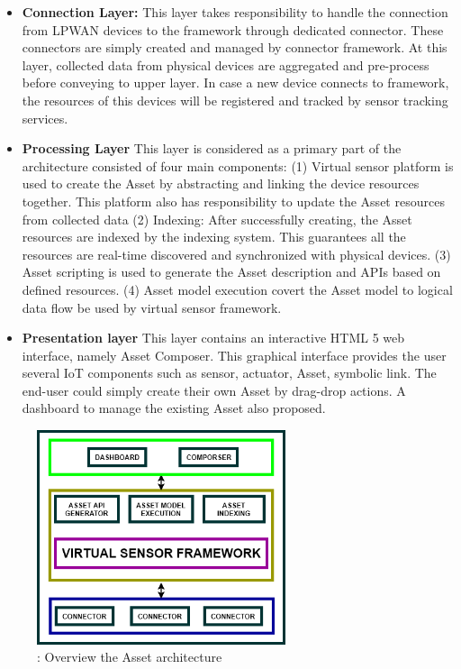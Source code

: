 \begin{itemize}
	\item \textbf{Connection Layer:} This layer takes responsibility to handle the connection from LPWAN devices to the framework through dedicated connector. These connectors are simply created and managed by connector framework. At this layer, collected data from physical devices are aggregated and pre-process before conveying to upper layer. In case a new device connects to framework, the resources of this devices will be registered and tracked by sensor tracking services. 
	\item \textbf{Processing Layer} This layer is considered as a primary part of the architecture consisted of four main components: 
	(1) Virtual sensor platform is used to create the Asset by abstracting and linking the device resources together. This platform also has responsibility to update the Asset resources from collected data
	(2) Indexing: After successfully creating, the Asset resources are indexed by the indexing system. This guarantees all the resources are real-time discovered and synchronized with physical devices. 
	(3) Asset scripting is used to generate the Asset description and APIs based on defined resources. 
	(4) Asset model execution covert the Asset model to logical data flow \cite{kim2017scalable} be used by virtual sensor framework.
	\item \textbf{Presentation layer} This layer contains an interactive HTML 5 web interface, namely Asset Composer. This graphical interface provides the user several IoT components such as sensor, actuator, Asset, symbolic link. The end-user could simply create their own Asset by drag-drop actions. A dashboard to manage the existing Asset also proposed.
\end{itemize}

\begin{figure}[h]
	\centering
	\includegraphics[width=0.65\textwidth]{./Part2/Chapter6/figures/overview_architecture.png}
	\caption{ : Overview the Asset architecture}
	\label{fig: Overview the Asset architecture}
\end{figure}

